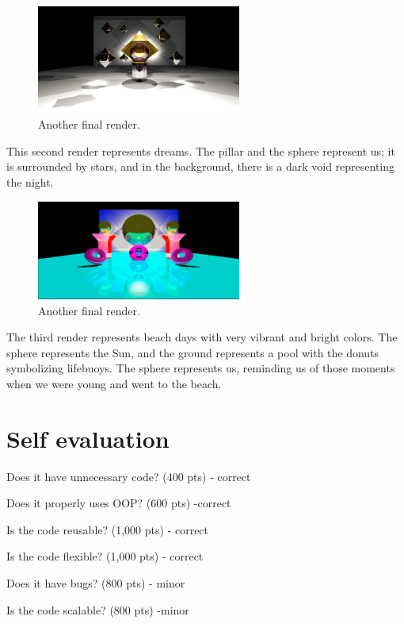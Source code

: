 \documentclass[12pt]{article}
\begin{document}
	\begin{figure}[h]
		\centering
		\includegraphics[width=0.6\textwidth]{FINAL2.png}
		\caption{Another final render.}
		\label{fig:image7}
	\end{figure}
	
	This second render represents dreams. The pillar and the sphere represent us; it is surrounded by stars, and in the background, there is a dark void representing the night.\\
	
	\begin{figure}[h]
		\centering
		\includegraphics[width=0.6\textwidth]{FINAL3.png}
		\caption{Another final render.}
		\label{fig:image7}
	\end{figure}
	
	The third render represents beach days with very vibrant and bright colors. The sphere represents the Sun, and the ground represents a pool with the donuts symbolizing lifebuoys. The sphere represents us, reminding us of those moments when we were young and went to the beach.
	\section{Self evaluation}
	Does it have unnecessary code? (400 pts) - correct
	
	Does it properly uses OOP? (600 pts) -correct
	
	Is the code reusable? (1,000 pts) - correct
	
	Is the code flexible? (1,000 pts) - correct
	
	Does it have bugs? (800 pts) - minor
	
	Is the code scalable? (800 pts) -minor
	
\end{document}
